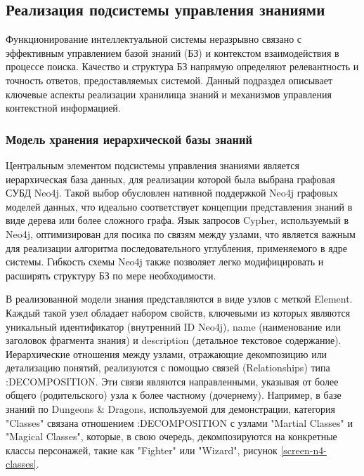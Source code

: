\subsection{Реализация подсистемы управления знаниями}

Функционирование интеллектуальной системы неразрывно связано с эффективным управлением базой знаний (БЗ) и контекстом взаимодействия в процессе поиска. Качество и структура БЗ напрямую определяют релевантность и точность ответов, предоставляемых системой. Данный подраздел описывает ключевые аспекты реализации хранилища знаний и механизмов управления контекстной информацией.

\subsubsection{Модель хранения иерархической базы знаний}

Центральным элементом подсистемы управления знаниями является иерархическая база данных, для реализации которой была выбрана графовая СУБД Neo4j. Такой выбор обусловлен нативной поддержкой Neo4j графовых моделей данных, что идеально соответствует концепции представления знаний в виде дерева или более сложного графа. Язык запросов Cypher, используемый в Neo4j, оптимизирован для посика по связям между узлами, что является важным для реализации алгоритма последовательного углубления, применяемого в ядре системы. Гибкость схемы Neo4j также позволяет легко модифицировать и расширять структуру БЗ по мере необходимости.


В реализованной модели знания представляются в виде узлов с меткой Element. Каждый такой узел обладает набором свойств, ключевыми из которых являются уникальный идентификатор (внутренний ID Neo4j), name (наименование или заголовок фрагмента знания) и description (детальное текстовое содержание). Иерархические отношения между узлами, отражающие декомпозицию или детализацию понятий, реализуются с помощью связей (Relationships) типа :DECOMPOSITION. Эти связи являются направленными, указывая от более общего (родительского) узла к более частному (дочернему). Например, в базе знаний по Dungeons & Dragons, используемой для демонстрации, категория "Classes" связана отношением :DECOMPOSITION с узлами "Martial Classes" и "Magical Classes", которые, в свою очередь, декомпозируются на конкретные классы персонажей, такие как "Fighter" или "Wizard", рисунок \ref{screen-n4-classes}.

